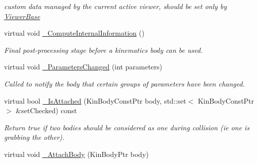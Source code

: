 \begin{DoxyCompactItemize}
\begin{DoxyCompactList}\small\item\em custom data managed by the current active viewer, should be set only by \hyperlink{classOpenRAVE_1_1ViewerBase}{ViewerBase} \item\end{DoxyCompactList}\item 
virtual void \hyperlink{classOpenRAVE_1_1KinBody_a3a10edb8cb573ac97bfed0e05dc2a29a}{\_\-ComputeInternalInformation} ()
\begin{DoxyCompactList}\small\item\em Final post-\/processing stage before a kinematics body can be used. \item\end{DoxyCompactList}\item 
virtual void \hyperlink{classOpenRAVE_1_1KinBody_a218a09068212db7bb35c7d4ce792e309}{\_\-ParametersChanged} (int parameters)
\begin{DoxyCompactList}\small\item\em Called to notify the body that certain groups of parameters have been changed. \item\end{DoxyCompactList}\item 
\hypertarget{classOpenRAVE_1_1KinBody_ad9ec7f6d7732afcf3696924265ea1a8b}{
virtual bool \hyperlink{classOpenRAVE_1_1KinBody_ad9ec7f6d7732afcf3696924265ea1a8b}{\_\-IsAttached} (KinBodyConstPtr body, std::set$<$ KinBodyConstPtr $>$ \&setChecked) const }
\label{classOpenRAVE_1_1KinBody_ad9ec7f6d7732afcf3696924265ea1a8b}

\begin{DoxyCompactList}\small\item\em Return true if two bodies should be considered as one during collision (ie one is grabbing the other). \item\end{DoxyCompactList}\item 
\hypertarget{classOpenRAVE_1_1KinBody_a1a340c6aa418a10fcf9847474376b1ba}{
virtual void \hyperlink{classOpenRAVE_1_1KinBody_a1a340c6aa418a10fcf9847474376b1ba}{\_\-AttachBody} (KinBodyPtr body)}
\label{classOpenRAVE_1_1KinBody_a1a340c6aa418a10fcf9847474376b1ba}


\end{DoxyCompactItemize}
